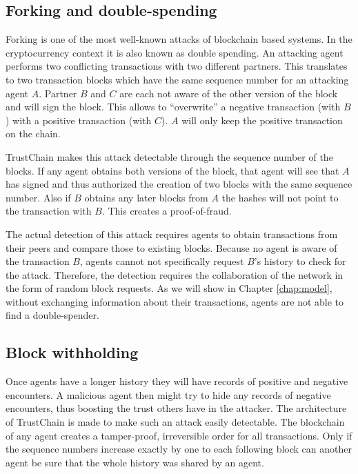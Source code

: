 \subsection{Forking and double-spending}
Forking is one of the most well-known attacks of blockchain based systems. In the cryptocurrency 
context it is also known as double spending. An attacking agent 
performs two conflicting transactions with two different partners. This translates to two transaction
blocks which have the same sequence number for an attacking agent $A$. Partner $B$ and $C$ are each
not aware of the other version of the block and will sign the block. This allows to ``overwrite''
a negative transaction (with $B$) with a positive transaction (with $C$). $A$ will only keep the positive transaction on 
the chain. 

TrustChain makes this attack detectable through the sequence number of the blocks. If any agent 
obtains both versions of the block, that agent will see that $A$ has signed and thus authorized the
creation of two blocks with the same sequence number. Also if $B$ obtains any later blocks from $A$ 
the hashes will not point to the transaction with $B$.  This creates a proof-of-fraud. 

The actual
detection of this attack requires agents to obtain transactions from their peers and compare those 
to existing blocks. Because no agent is aware of the transaction $B$, agents cannot not specifically 
request $B$'s history to check for the attack. Therefore, the detection requires the collaboration
of the network in the form of random block requests. As we will show in Chapter \ref{chap:model}, 
without exchanging information about their transactions, agents are not able to find a double-spender.

\subsection{Block withholding}
Once agents have a longer history they will have records of positive and negative encounters. A 
malicious agent then might try to hide any records of negative encounters, thus boosting the trust 
others have in the attacker. The architecture of TrustChain is made to make such an attack easily detectable.
The blockchain of any agent creates a tamper-proof, irreversible order for all transactions. Only if
the sequence numbers increase exactly by one to each following block can another agent be sure that 
the whole history was shared by an agent. 

